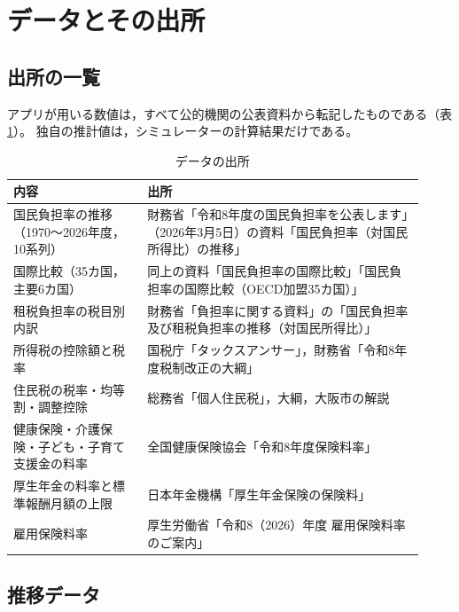 \documentclass[paper=a4,fontsize=10pt]{jlreq}
\begin{document}
\section{データとその出所}\label{sec:data}

\subsection{出所の一覧}

アプリが用いる数値は，すべて公的機関の公表資料から転記したものである（表\ref{tab:sources}）。
独自の推計値は，シミュレーターの計算結果だけである。

\begin{table}[htbp]
  \centering
  \caption{データの出所}\label{tab:sources}
  \begin{tabular}{p{0.30\linewidth}p{0.62\linewidth}}
    \toprule
    内容 & 出所 \\
    \midrule
    国民負担率の推移（1970〜2026年度，10系列） &
      財務省「令和8年度の国民負担率を公表します」（2026年3月5日）の資料「国民負担率（対国民所得比）の推移」\cite{mof2026} \\
    国際比較（35カ国，主要6カ国） &
      同上の資料「国民負担率の国際比較」「国民負担率の国際比較（OECD加盟35カ国）」\cite{mof2026} \\
    租税負担率の税目別内訳 &
      財務省「負担率に関する資料」の「国民負担率及び租税負担率の推移（対国民所得比）」\cite{mofa04} \\
    所得税の控除額と税率 &
      国税庁「タックスアンサー」\cite{nta}，財務省「令和8年度税制改正の大綱」\cite{taikou2026} \\
    住民税の税率・均等割・調整控除 &
      総務省「個人住民税」\cite{soumu}，大綱\cite{taikou2026}，大阪市の解説\cite{osaka} \\
    健康保険・介護保険・子ども・子育て支援金の料率 &
      全国健康保険協会「令和8年度保険料率」\cite{kenpo2026} \\
    厚生年金の料率と標準報酬月額の上限 &
      日本年金機構「厚生年金保険の保険料」\cite{nenkin} \\
    雇用保険料率 &
      厚生労働省「令和8（2026）年度 雇用保険料率のご案内」\cite{mhlw2026} \\
    \bottomrule
  \end{tabular}
\end{table}

\subsection{推移データ}
\end{document}

